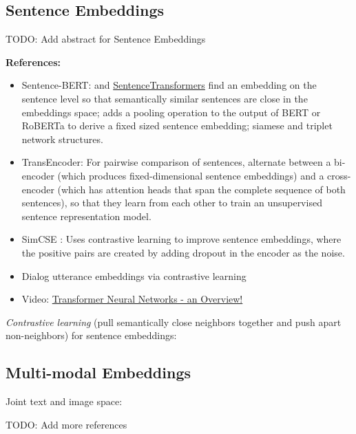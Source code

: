 \documentclass[11pt, a4paper]{amsart}
\begin{document}
\subsection{Sentence Embeddings}

TODO: Add abstract for Sentence Embeddings


\noindent \textbf{References:}
\begin{itemize}
	\item Sentence-BERT: \cite{DBLP:journals/corr/abs-1908-10084} and \href{https://www.sbert.net/}{SentenceTransformers}
	find an embedding on the sentence level so that semantically similar sentences are close in the embeddings space;
	adds a pooling operation to the output of BERT or RoBERTa to derive a fixed sized sentence embedding;
	siamese and triplet network structures.
	\item TransEncoder: For pairwise comparison of sentences, \cite{DBLP:journals/corr/abs-2109-13059} alternate between a bi-encoder (which produces fixed-dimensional sentence embeddings) and a cross-encoder (which has attention heads that span the complete sequence of both sentences), so that they learn from each other to train an unsupervised sentence representation model.
	\item SimCSE \cite{DBLP:journals/corr/abs-2104-08821}: Uses contrastive learning to improve sentence embeddings, where the positive pairs are created by adding dropout in the encoder as the noise.
	\item Dialog utterance embeddings via contrastive learning \cite{https://doi.org/10.48550/arxiv.2205.13568}
	\item Video: \href{https://youtu.be/O3xbVmpdJwU}{Transformer Neural Networks - an Overview!}
\end{itemize}

{
	\color{blue}
	
	\emph{Contrastive learning} (pull semantically close neighbors together and push apart non-neighbors) for sentence embeddings:
} %


\subsection{Multi-modal Embeddings}

Joint text and image space:
\cite{DBLP:journals/corr/abs-2111-07180}

TODO: Add more references

\end{document}
